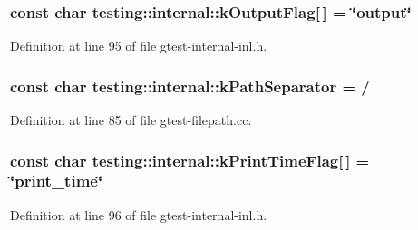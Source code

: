 \subsubsection[{\texorpdfstring{k\+Output\+Flag}{kOutputFlag}}]{\setlength{\rightskip}{0pt plus 5cm}const char testing\+::internal\+::k\+Output\+Flag\mbox{[}$\,$\mbox{]} = \char`\"{}output\char`\"{}}\hypertarget{namespacetesting_1_1internal_abd5368e00a31d175c6696cf76cbbde10}{}\label{namespacetesting_1_1internal_abd5368e00a31d175c6696cf76cbbde10}


Definition at line 95 of file gtest-\/internal-\/inl.\+h.

\subsubsection[{\texorpdfstring{k\+Path\+Separator}{kPathSeparator}}]{\setlength{\rightskip}{0pt plus 5cm}const char testing\+::internal\+::k\+Path\+Separator = \textquotesingle{}/\textquotesingle{}}\hypertarget{namespacetesting_1_1internal_afcd71adaa9d1e6df7b282a17fc48125c}{}\label{namespacetesting_1_1internal_afcd71adaa9d1e6df7b282a17fc48125c}


Definition at line 85 of file gtest-\/filepath.\+cc.

\subsubsection[{\texorpdfstring{k\+Print\+Time\+Flag}{kPrintTimeFlag}}]{\setlength{\rightskip}{0pt plus 5cm}const char testing\+::internal\+::k\+Print\+Time\+Flag\mbox{[}$\,$\mbox{]} = \char`\"{}print\+\_\+time\char`\"{}}\hypertarget{namespacetesting_1_1internal_aa6c13109bb4c78740ddb082b1ec0de56}{}\label{namespacetesting_1_1internal_aa6c13109bb4c78740ddb082b1ec0de56}


Definition at line 96 of file gtest-\/internal-\/inl.\+h.

